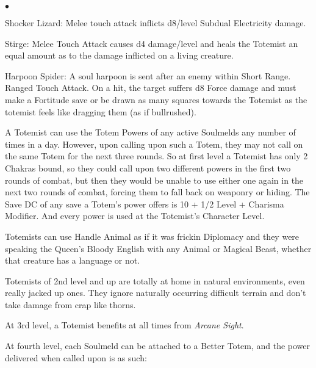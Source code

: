 {\begin{list}{$\bullet$}{\itemspace}
\item Shocker Lizard: Melee touch attack inflicts d8/level Subdual Electricity damage.
\item Stirge: Melee Touch Attack causes d4 damage/level and heals the Totemist an equal amount as to the damage inflicted on a living creature.
\item Harpoon Spider: A soul harpoon is sent after an enemy within Short Range. Ranged Touch Attack. On a hit, the target suffers d8 Force damage and must make a Fortitude save or be drawn as many squares towards the Totemist as the totemist feels like dragging them (as if bullrushed).
\item 
\end{list}}

 A Totemist can use the Totem Powers of any active Soulmelds any number of times in a day. However, upon calling upon such a Totem, they may not call on the same Totem for the next three rounds. So at first level a Totemist has only 2 Chakras bound, so they could call upon two different powers in the first two rounds of combat, but then they would be unable to use either one again in the next two rounds of combat, forcing them to fall back on weaponry or hiding. The Save DC of any save a Totem's power offers is 10 + 1/2 Level + Charisma Modifier. And every power is used at the Totemist's Character Level.

 Totemists can use Handle Animal as if it was frickin Diplomacy and they were speaking the Queen's Bloody English with any Animal or Magical Beast, whether that creature has a language or not.


 Totemists of 2nd level and up are totally at home in natural environments, even really jacked up ones. They ignore naturally occurring difficult terrain and don't take damage from crap like thorns.

 At 3rd level, a Totemist benefits at all times from \emph{Arcane Sight}.

 At fourth level, each Soulmeld can be attached to a Better Totem, and the power delivered when called upon is as such:

